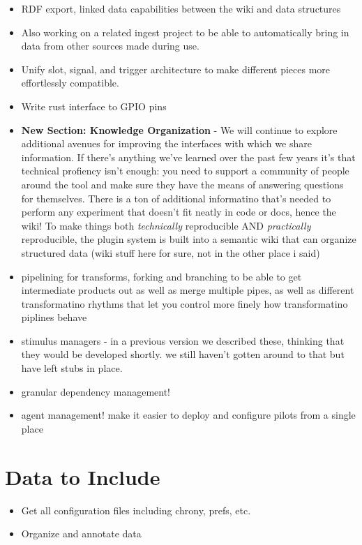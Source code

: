 \begin{itemize}
\item RDF export, linked data capabilities between the wiki and data structures
\item Also working on a related ingest project to be able to automatically bring in data from other sources made during use. 
\item Unify slot, signal, and trigger architecture to make different pieces more effortlessly compatible.
\item Write rust interface to GPIO pins
\item \textbf{New Section: Knowledge Organization} - We will continue to explore additional avenues for improving the interfaces with which we share information. If there's anything we've learned over the past few years it's that technical profiency isn't enough: you need to support a community of people around the tool and make sure they have the means of answering questions for themselves. There is a ton of additional informatino that's needed to perform any experiment that doesn't fit neatly in code or docs, hence the wiki! To make things both \textit{technically} reproducible AND \textit{practically} reproducible, the plugin system is built into a semantic wiki that can organize structured data (wiki stuff here for sure, not in the other place i said)
\item pipelining for transforms, forking and branching to be able to get intermediate products out as well as merge multiple pipes, as well as different transformatino rhythms that let you control more finely how transformatino piplines behave
\item stimulus managers - in a previous version we described these, thinking that they would be developed shortly. we still haven't gotten around to that but have left stubs in place.
\item granular dependency management!
\item agent management! make it easier to deploy and configure pilots from a single place
\end{itemize}

\section{Data to Include}

\begin{itemize}
\item Get all configuration files including chrony, prefs, etc.
\item Organize and annotate data
\end{itemize}

